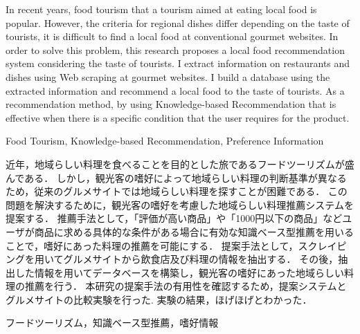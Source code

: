 \documentclass{funthesis}
\begin{document}
\maketitle       %

\begin{eabstract}
In recent years, food tourism that a tourism aimed at eating local food is popular.
However, the criteria for regional dishes differ depending on the taste of tourists, it is difficult to find a local food at conventional gourmet websites.
In order to solve this problem, this research proposes a local food recommendation system considering the taste of tourists.
I extract information on restaurants and dishes using Web scraping at gourmet websites.
I build a database using the extracted information and recommend a local food to the taste of tourists.
As a recommendation method, by using Knowledge-based Recommendation  that is effective when there is a specific condition that the user requires for the product.
\end{eabstract}

\begin{ekeyword}
Food Tourism, Knowledge-based Recommendation, Preference Information
\end{ekeyword}

\begin{jabstract}
近年，地域らしい料理を食べることを目的とした旅であるフードツーリズムが盛んである．
しかし，観光客の嗜好によって地域らしい料理の判断基準が異なるため，従来のグルメサイトでは地域らしい料理を探すことが困難である．
この問題を解決するために，観光客の嗜好を考慮した地域らしい料理推薦システムを提案する．
推薦手法として，「評価が高い商品」や「1000円以下の商品」などユーザが商品に求める具体的な条件がある場合に有効な知識ベース型推薦を用いることで，嗜好にあった料理の推薦を可能にする．
提案手法として，スクレイピングを用いてグルメサイトから飲食店及び料理の情報を抽出する．
その後，抽出した情報を用いてデータベースを構築し，観光客の嗜好にあった地域らしい料理の推薦を行う．
本研究の提案手法の有用性を確認するため，提案システムとグルメサイトの比較実験を行った.
実験の結果，ほげほげとわかった．
\end{jabstract}

\begin{jkeyword}
フードツーリズム，知識ベース型推薦，嗜好情報
\end{jkeyword}
\end{document}
